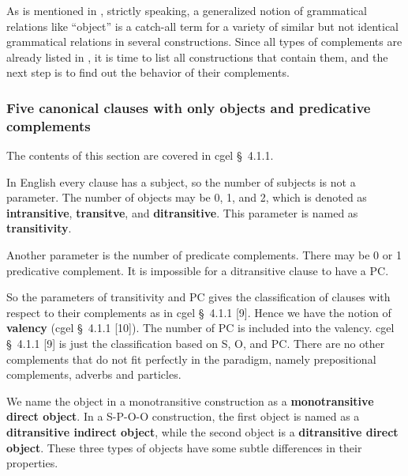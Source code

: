 \documentclass{article}
\newcommand*{\citesec}[1]{\S~{#1}}
\newcommand*{\concept}[1]{\textbf{#1}}
\begin{document}
As is mentioned in ,
strictly speaking, 
a generalized notion of grammatical relations like ``object'' 
is a catch-all term for a variety of similar but not identical grammatical relations 
in several constructions.
Since all types of complements are already listed in ,
it is time to list all constructions that contain them, 
and the next step is to find out the behavior of their complements.

\subsubsection{Five canonical clauses with only objects and predicative complements}

The contents of this section are covered in \ac{cgel} \citesec{4.1.1}.


In English every clause has a subject, so the number of subjects is not a parameter.
The number of objects may be 0, 1, and 2,
which is denoted as \concept{intransitive}, \concept{transitve}, and \concept{ditransitive}.
This parameter is named as \concept{transitivity}.


Another parameter is the number of predicate complements.
There may be 0 or 1 predicative complement.
It is impossible for a ditransitive clause to have a PC.

So the parameters of transitivity and PC gives the classification 
of clauses with respect to their complements 
as in \ac{cgel} \citesec{4.1.1} [9].
Hence we have the notion of \concept{valency} (\ac{cgel} \citesec{4.1.1} [10]). 
The number of PC is included into the valency.
\ac{cgel} \citesec{4.1.1} [9] is just the classification based on S, O, and PC.
There are no other complements that do not fit perfectly in the paradigm,
namely prepositional complements, adverbs and particles.

We name the object in a monotransitive construction as a \concept{monotransitive direct object}.
In a S-P-O-O construction, 
the first object is named as a \concept{ditransitive indirect object},
while the second object is a \concept{ditransitive direct object}.
These three types of objects have some subtle differences in their properties. %
\end{document}
